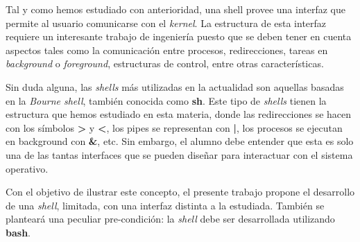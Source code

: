 Tal y como hemos estudiado con anterioridad, una shell provee una interfaz que permite al usuario comunicarse con el \textit{kernel}. La estructura de esta interfaz requiere un interesante trabajo de ingeniería puesto que se deben tener en cuenta aspectos tales como la comunicación entre procesos, redirecciones, tareas en \textit{background} o \textit{foreground}, estructuras de control, entre otras características.

Sin duda alguna, las \textit{shells} más utilizadas en la actualidad son aquellas basadas en la \textit{Bourne shell}, también conocida como \textbf{sh}. Este tipo de \textit{shells} tienen la estructura que hemos estudiado en esta materia, donde las redirecciones se hacen con los símbolos \textbf{>} y \textbf{<}, los pipes se representan con \textbf{|}, los procesos se ejecutan en background con \textbf{\&}, etc. Sin embargo, el alumno debe entender que esta es solo una de las tantas interfaces que se pueden diseñar para interactuar con el sistema operativo.

Con el objetivo de ilustrar este concepto, el presente trabajo propone el desarrollo de una \textit{shell}, limitada, con una interfaz distinta a la estudiada. También se planteará una peculiar pre-condición: la \textit{shell} debe ser desarrollada utilizando \textbf{bash}.



